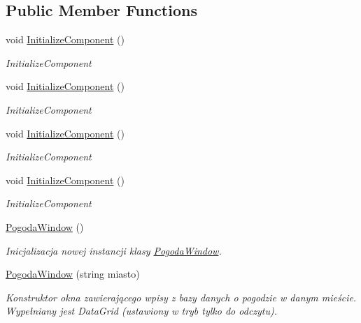 \subsection*{Public Member Functions}
\begin{DoxyCompactItemize}
\item 
void \mbox{\hyperlink{class_projekt_1_1_pogoda_window_a6800b0c504dd7256b2bcfb3352b6206f}{Initialize\+Component}} ()
\begin{DoxyCompactList}\small\item\em Initialize\+Component \end{DoxyCompactList}\item 
void \mbox{\hyperlink{class_projekt_1_1_pogoda_window_a6800b0c504dd7256b2bcfb3352b6206f}{Initialize\+Component}} ()
\begin{DoxyCompactList}\small\item\em Initialize\+Component \end{DoxyCompactList}\item 
void \mbox{\hyperlink{class_projekt_1_1_pogoda_window_a6800b0c504dd7256b2bcfb3352b6206f}{Initialize\+Component}} ()
\begin{DoxyCompactList}\small\item\em Initialize\+Component \end{DoxyCompactList}\item 
void \mbox{\hyperlink{class_projekt_1_1_pogoda_window_a6800b0c504dd7256b2bcfb3352b6206f}{Initialize\+Component}} ()
\begin{DoxyCompactList}\small\item\em Initialize\+Component \end{DoxyCompactList}\item 
\mbox{\hyperlink{class_projekt_1_1_pogoda_window_a7a87623d9e990514fc4e2260b2db4360}{Pogoda\+Window}} ()
\begin{DoxyCompactList}\small\item\em Inicjalizacja nowej instancji klasy \mbox{\hyperlink{class_projekt_1_1_pogoda_window}{Pogoda\+Window}}. \end{DoxyCompactList}\item 
\mbox{\hyperlink{class_projekt_1_1_pogoda_window_aaea0b7b7904650f753f846f871cd15e4}{Pogoda\+Window}} (string miasto)
\begin{DoxyCompactList}\small\item\em Konstruktor okna zawierającego wpisy z bazy danych o pogodzie w danym mieście. Wypełniany jest Data\+Grid (ustawiony w tryb tylko do odczytu). \end{DoxyCompactList}\end{DoxyCompactItemize}


